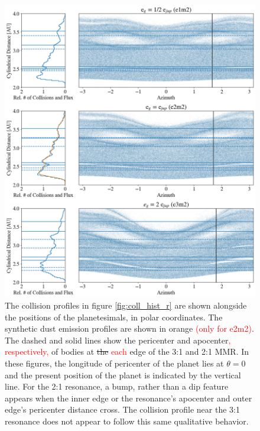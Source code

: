 \documentclass[twocolumn]{aastex63}
\newcommand{\ACBc}[1]{\textcolor{red}{#1}}
\begin{document}
\begin{figure}
    \includegraphics[width=\textwidth]{figures/coll_polar_e.png}
    \caption{The collision profiles in figure \ref{fig:coll_hist_r} are shown alongside the positions of the planetesimals, in polar coordinates. The 
    synthetic dust emission profiles are shown in orange \ACBc{(only for e2m2)}. The dashed and solid lines show the pericenter and apocenter\ACBc{, respectively,} of bodies at \sout{the} \ACBc{each} edge of the 
    3:1 and 2:1 MMR. In these figures, the longitude of pericenter of the planet lies at $\theta = 0$ and the present position of the planet is indicated 
    by the vertical line. For the 2:1 resonance, a bump, rather than a dip feature appears when the inner edge or the resonance's apocenter and outer 
    edge's pericenter distance cross. The collision profile near the 3:1 resonance does not appear to follow this same qualitative behavior.
    \label{fig:coll_polar_e}}
\end{figure}
\end{document}
